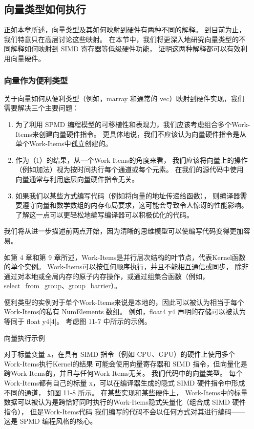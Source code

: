 \subsection{向量类型如何执行}
正如本章所述，向量类型及其如何映射到硬件有两种不同的解释。 到目前为止，我们特意只在高层讨论这些映射。 
在本节中，我们将更深入地研究向量类型的不同解释如何映射到 SIMD 寄存器等低级硬件功能，
证明这两种解释都可以有效利用向量硬件。

\subsubsection{向量作为便利类型}
关于向量如何从便利类型（例如，marray 和通常的 vec）映射到硬件实现，我们需要解决三个主要问题：

\begin{enumerate}
	\item 为了利用 SPMD 编程模型的可移植性和表现力，我们应该考虑组合多个Work-Items来创建向量硬件指令。 
	更具体地说，我们不应该认为向量硬件指令是从单个Work-Items中孤立创建的。

	\item 作为（1）的结果，从一个Work-Items的角度来看，
	我们应该将向量上的操作（例如加法）视为按时间执行每个通道或每个元素。 
	在我们的源代码中使用向量通常与利用底层向量硬件指令无关。

	\item 如果我们以某些方式编写代码（例如将向量的地址传递给函数），
	则编译器需要遵守向量和数学数组的内存布局要求，这可能会导致令人惊讶的性能影响。 
	了解这一点可以更轻松地编写编译器可以积极优化的代码。
\end{enumerate}

我们将从进一步描述前两点开始，因为清晰的思维模型可以使编写代码变得更加容易。

如第 4 章和第 9 章所述，Work-Items是并行层次结构的叶节点，代表Kernel函数的单个实例。 
Work-Items可以按任何顺序执行，并且不能相互通信或同步，
除非通过对本地或全局内存的原子内存操作，或通过组集合函数（例如，select\_from\_group、group\_barrier）。

便利类型的实例对于单个Work-Items来说是本地的，因此可以被认为相当于每个Work-Items的私有 NumElements 数组。 
例如，float4 y4 声明的存储可以被认为等同于 float y4[4]。 考虑图 11-7 中所示的示例。

{\color{red} 向量执行示例}

对于标量变量 x，在具有 SIMD 指令（例如 CPU、GPU）的硬件上使用多个Work-Items执行Kernel的结果
可能会使用向量寄存器和 SIMD 指令，但向量化是跨Work-Items的，并且与任何Work-Items无关。 
我们代码中的向量类型。 每个Work-Items都有自己的标量 x，可以在编译器生成的隐式 SIMD 硬件指令中形成不同的通道，
如图 11-8 所示。 在某些实现和某些硬件上，
Work-Items中的标量数据可以被认为是跨恰好同时执行的Work-Items隐式矢量化（组合成 SIMD 硬件指令），
但是Work-Items代码 我们编写的代码不会以任何方式对其进行编码——这是 SPMD 编程风格的核心。

